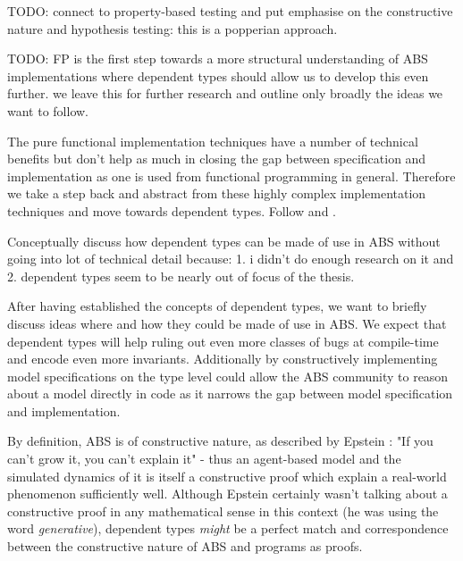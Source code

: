 TODO: connect to property-based testing and put emphasise on the constructive nature and hypothesis testing: this is a popperian approach.

TODO: FP is the first step towards a more structural understanding of ABS implementations where dependent types should allow us to develop this even further. we leave this for further research and outline only broadly the ideas we want to follow.


The pure functional implementation techniques have a number of technical benefits but don't help as much in closing the gap between specification and implementation as one is used from functional programming in general. Therefore we take a step back and abstract from these highly complex implementation techniques and move towards dependent types. Follow \cite{botta_time_2010} and \cite{botta_functional_2011}.

Conceptually discuss how dependent types can be made of use in ABS without going into lot of technical detail because: 1. i didn't do enough research on it and 2. dependent types seem to be nearly out of focus of the thesis.



After having established the concepts of dependent types, we want to briefly discuss ideas where and how they could be made of use in ABS. We expect that dependent types will help ruling out even more classes of bugs at compile-time and encode even more invariants. Additionally by constructively implementing model specifications on the type level could allow the ABS community to reason about a model directly in code as it narrows the gap between model specification and implementation.

By definition, ABS is of constructive nature, as described by Epstein \cite{epstein_chapter_2006}: "If you can't grow it, you can't explain it" - thus an agent-based model and the simulated dynamics of it is itself a constructive proof which explain a real-world phenomenon sufficiently well. Although Epstein certainly wasn't talking about a constructive proof in any mathematical sense in this context (he was using the word \textit{generative}), dependent types \textit{might} be a perfect match and correspondence between the constructive nature of ABS and programs as proofs.

